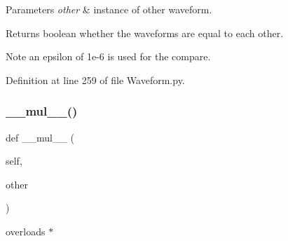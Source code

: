 \begin{DoxyParams}{Parameters}
{\em other} & instance of other waveform. \\
\hline
\end{DoxyParams}
\begin{DoxyReturn}{Returns}
boolean whether the waveforms are equal to each other. 
\end{DoxyReturn}
\begin{DoxyNote}{Note}
an epsilon of 1e-\/6 is used for the compare. 
\end{DoxyNote}


Definition at line 259 of file Waveform.\+py.

\mbox{\label{classSignalIntegrity_1_1TimeDomain_1_1Waveform_1_1Waveform_1_1Waveform_a96fd98a8997501189d60829abc0257cb}} 
\subsubsection{\texorpdfstring{\+\_\+\+\_\+mul\+\_\+\+\_\+()}{\_\_mul\_\_()}}
{\footnotesize\ttfamily def \+\_\+\+\_\+mul\+\_\+\+\_\+ (\begin{DoxyParamCaption}\item[{}]{self,  }\item[{}]{other }\end{DoxyParamCaption})}



overloads $\ast$ 


